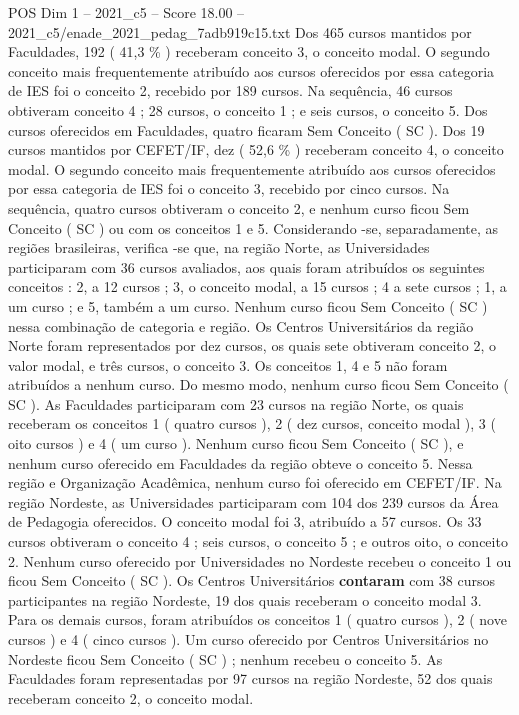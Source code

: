 \begin{textsample}{POS Dim 1 – 2021\_c5 – Score 18.00 – 2021\_c5/enade\_2021\_pedag\_7adb919c15.txt}
Dos 465 cursos mantidos por Faculdades, 192 ( 41,3 \% ) receberam conceito 3, o conceito modal.
O segundo conceito mais frequentemente atribuído aos cursos oferecidos por essa categoria de IES foi o conceito 2, recebido por 189 cursos.
Na sequência, 46 cursos obtiveram conceito 4 ; 28 cursos, o conceito 1 ; e seis cursos, o conceito 5.
Dos cursos oferecidos em Faculdades, quatro ficaram Sem Conceito ( SC ).
Dos 19 cursos mantidos por CEFET/IF, dez ( 52,6 \% ) receberam conceito 4, o conceito modal.
O segundo conceito mais frequentemente atribuído aos cursos oferecidos por essa categoria de IES foi o conceito 3, recebido por cinco cursos.
Na sequência, quatro cursos obtiveram o conceito 2, e nenhum curso ficou Sem Conceito ( SC ) ou com os conceitos 1 e 5.
Considerando -se, separadamente, as regiões brasileiras, verifica -se que, na região Norte, as Universidades participaram com 36 cursos avaliados, aos quais foram atribuídos os seguintes conceitos : 2, a 12 cursos ; 3, o conceito modal, a 15 cursos ; 4 a sete cursos ; 1, a um curso ; e 5, também a um curso.
Nenhum curso ficou Sem Conceito ( SC ) nessa combinação de categoria e região.
Os Centros Universitários da região Norte foram representados por dez cursos, os quais sete obtiveram conceito 2, o valor modal, e três cursos, o conceito 3.
Os conceitos 1, 4 e 5 não foram atribuídos a nenhum curso.
Do mesmo modo, nenhum curso ficou Sem Conceito ( SC ).
As Faculdades participaram com 23 cursos na região Norte, os quais receberam os conceitos 1 ( quatro cursos ), 2 ( dez cursos, conceito modal ), 3 ( oito cursos ) e 4 ( um curso ).
Nenhum curso ficou Sem Conceito ( SC ), e nenhum curso oferecido em Faculdades da região obteve o conceito 5.
Nessa região e Organização Acadêmica, nenhum curso foi oferecido em CEFET/IF.
Na região Nordeste, as Universidades participaram com 104 dos 239 cursos da Área de Pedagogia oferecidos.
O conceito modal foi 3, atribuído a 57 cursos.
Os 33 cursos obtiveram o conceito 4 ; seis cursos, o conceito 5 ; e outros oito, o conceito 2.
Nenhum curso oferecido por Universidades no Nordeste recebeu o conceito 1 ou ficou Sem Conceito ( SC ).
Os Centros Universitários \textbf{contaram} com 38 cursos participantes na região Nordeste, 19 dos quais receberam o conceito modal 3.
Para os demais cursos, foram atribuídos os conceitos 1 ( quatro cursos ), 2 ( nove cursos ) e 4 ( cinco cursos ).
Um curso oferecido por Centros Universitários no Nordeste ficou Sem Conceito ( SC ) ; nenhum recebeu o conceito 5.
As Faculdades foram representadas por 97 cursos na região Nordeste, 52 dos quais receberam conceito 2, o conceito modal.

\end{textsample}
